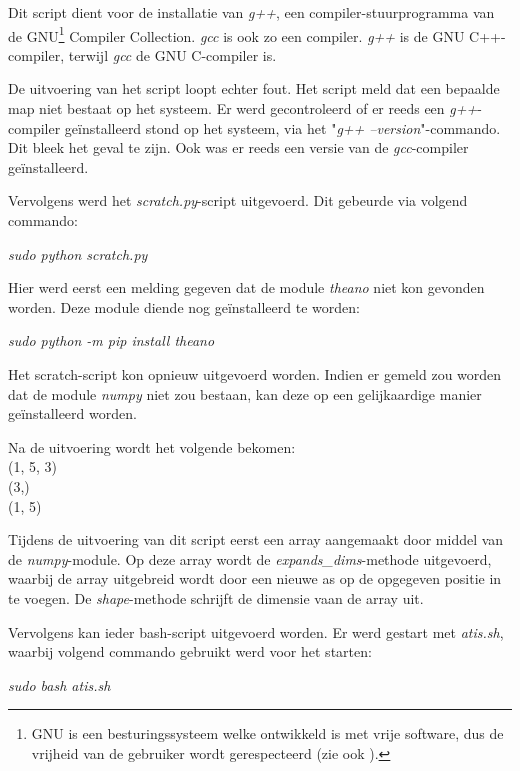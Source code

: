 Dit script dient voor de installatie van \textit{g++}, een compiler-stuurprogramma van de GNU\footnote{GNU is een besturingssysteem welke ontwikkeld is met vrije software, dus de vrijheid van de gebruiker wordt gerespecteerd (zie ook \textcite{gnu}).} Compiler Collection. \textit{gcc} is ook zo een compiler. \textit{g++} is de GNU C++-compiler, terwijl \textit{gcc} de GNU C-compiler is.

De uitvoering van het script loopt echter fout. Het script meld dat een bepaalde map niet bestaat op het systeem. Er werd gecontroleerd of er reeds een \textit{g++}-compiler geïnstalleerd stond op het systeem, via het "\textit{g++ --version}"-commando. Dit bleek het geval te zijn. Ook was er reeds een versie van de \textit{gcc}-compiler geïnstalleerd.

Vervolgens werd het \textit{scratch.py}-script uitgevoerd. Dit gebeurde via volgend commando:

\begin{center}
	\textit{sudo python scratch.py}
\end{center}

Hier werd eerst een melding gegeven dat de module \textit{theano} niet kon gevonden worden. Deze module diende nog geïnstalleerd te worden:

\begin{center}
	\textit{sudo python -m pip install theano}
\end{center}

Het scratch-script kon opnieuw uitgevoerd worden. Indien er gemeld zou worden dat de module \textit{numpy} niet zou bestaan, kan deze op een gelijkaardige manier geïnstalleerd worden.

Na de uitvoering wordt het volgende bekomen: \\
(1, 5, 3) \\
(3,) \\
(1, 5)

Tijdens de uitvoering van dit script eerst een array aangemaakt door middel van de \textit{numpy}-module. Op deze array wordt de \textit{expands\_dims}-methode uitgevoerd, waarbij de array uitgebreid wordt door een nieuwe as op de opgegeven positie in te voegen. De \textit{shape}-methode schrijft de dimensie vaan de array uit. 

Vervolgens kan ieder bash-script uitgevoerd worden. Er werd gestart met \textit{atis.sh}, waarbij volgend commando gebruikt werd voor het starten:

\begin{center}
	\textit{sudo bash atis.sh}
\end{center}

